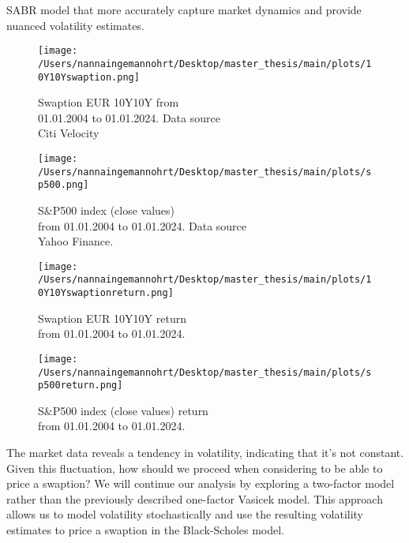 SABR model that more accurately capture market dynamics and provide nuanced volatility estimates.
\begin{figure}[H]
    \centering
    \begin{minipage}{0.5\textwidth}
        \texttt{[image: /Users/nannaingemannohrt/Desktop/master\_thesis/main/plots/10Y10Yswaption.png]}
        \caption{Swaption EUR 10Y10Y from \\ 01.01.2004  to 01.01.2024. Data source \\ Citi Velocity }
        \label{10Y10Y dev}
    \end{minipage}\hfill 
    \begin{minipage}{0.5\textwidth}
        \texttt{[image: /Users/nannaingemannohrt/Desktop/master\_thesis/main/plots/sp500.png]}
        \caption{S$\&$P500 index (close values) \\ from 01.01.2004 to 01.01.2024. Data source \\Yahoo Finance. }
        \label{sp500 dev}
    \end{minipage}
\end{figure}

\begin{figure}[H]
    \centering
    \begin{minipage}{0.5\textwidth}
        \texttt{[image: /Users/nannaingemannohrt/Desktop/master\_thesis/main/plots/10Y10Yswaptionreturn.png]}
        \caption{Swaption EUR 10Y10Y return \\ from  01.01.2004 to 01.01.2024.}
        \label{10Y10Y return}
    \end{minipage}\hfill 
    \begin{minipage}{0.5\textwidth}
        \texttt{[image: /Users/nannaingemannohrt/Desktop/master\_thesis/main/plots/sp500return.png]}
        \caption{S$\&$P500 index (close values) return  \\ from 01.01.2004 to 01.01.2024.}
        \label{sp500 return}
    \end{minipage}
\end{figure}
\noindent
The market data reveals a tendency in 
volatility, indicating that it's not constant. 
Given this fluctuation, how should we proceed when 
considering to be able to price a swaption? We will continue our 
analysis by exploring a two-factor model rather 
than the previously described one-factor Vasicek model. 
This approach allows us to model volatility 
stochastically and use the resulting volatility 
estimates to price a swaption in the Black-Scholes model. 
